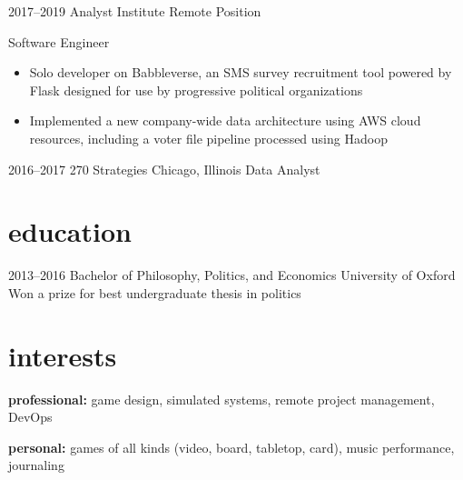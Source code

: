 \documentclass[letterpaper]{friggeri-cv} %
\begin{document}
\begin{entrylist}
\entry
{2017--2019}
{Analyst Institute}
{Remote Position}
{{Software Engineer}
\begin{itemize}
\item Solo developer on Babbleverse, an SMS survey recruitment tool powered by Flask designed for use by progressive political organizations
\item Implemented a new company-wide data architecture using AWS cloud resources, including a voter file pipeline processed using Hadoop
\end{itemize}}


\entry
{2016--2017}
{270 Strategies}
{Chicago, Illinois}
{Data Analyst}


\end{entrylist}


\section{education}

\begin{entrylist}


\entry
{2013--2016}
{Bachelor {\normalfont of Philosophy, Politics, and Economics}}
{University of Oxford}
{Won a prize for best undergraduate thesis in politics}


\end{entrylist}


\section{interests}

\textbf{professional:} game design, simulated systems, remote project management, DevOps 

\textbf{personal:} games of all kinds (video, board, tabletop, card), music performance, journaling

\end{document}
